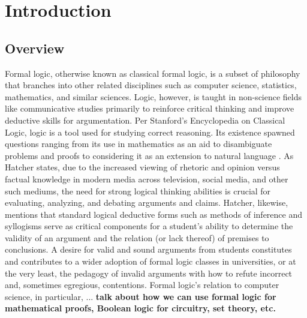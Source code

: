 \documentclass[ms]{uncgdissertationexp2}
\theoremstyle{plain}
\theoremstyle{definition}
\theoremstyle{remark}
\begin{document}
\tableofcontents 





\mainmatter %
\chapter{Introduction}
    \section{Overview}
    Formal logic, otherwise known as classical formal logic, is a subset of philosophy that branches into other related disciplines such as computer science, statistics, mathematics, and similar sciences. Logic, however, is taught in non-science fields like communicative studies primarily to reinforce critical thinking and improve deductive skills for argumentation. Per Stanford's Encyclopedia on Classical Logic, logic is a tool used for studying correct reasoning. Its existence spawned questions ranging from its use in mathematics as an aid to disambiguate problems and proofs to considering it as an extension to natural language \cite{stanfordencyclopedia}. As Hatcher \cite{hatcher} states, due to the increased viewing of rhetoric and opinion versus factual knowledge in modern media across television, social media, and other such mediums, the need for strong logical thinking abilities is crucial for evaluating, analyzing, and debating arguments and claims. Hatcher, likewise, mentions that standard logical deductive forms such as methods of inference and syllogisms serve as critical components for a student's ability to determine the validity of an argument and the relation (or lack thereof) of premises to conclusions. A desire for valid and sound arguments from students constitutes and contributes to a wider adoption of formal logic classes in universities, or at the very least, the pedagogy of invalid arguments with how to refute incorrect and, sometimes egregious, contentions.  Formal logic's relation to computer science, in particular, ... \textbf{talk about how we can use formal logic for mathematical proofs, Boolean logic for circuitry, set theory, etc.}
\end{document}
